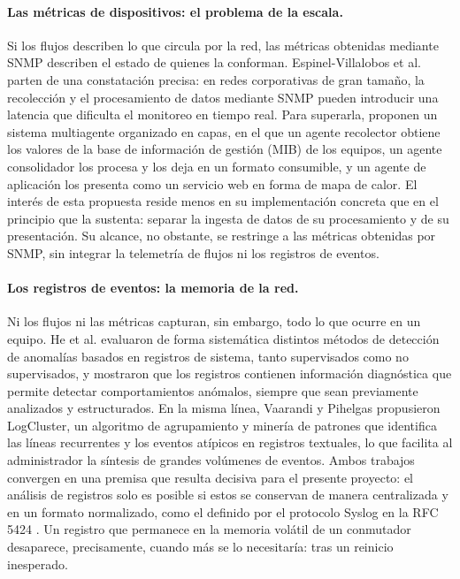\paragraph{Las métricas de dispositivos: el problema de la escala.}
Si los flujos describen lo que circula por la red, las métricas obtenidas mediante SNMP describen el estado de quienes la conforman. Espinel-Villalobos et al. \cite{espinel2022design} parten de una constatación precisa: en redes corporativas de gran tamaño, la recolección y el procesamiento de datos mediante SNMP pueden introducir una latencia que dificulta el monitoreo en tiempo real. Para superarla, proponen un sistema multiagente organizado en capas, en el que un agente recolector obtiene los valores de la base de información de gestión (MIB) de los equipos, un agente consolidador los procesa y los deja en un formato consumible, y un agente de aplicación los presenta como un servicio web en forma de mapa de calor. El interés de esta propuesta reside menos en su implementación concreta que en el principio que la sustenta: separar la ingesta de datos de su procesamiento y de su presentación. Su alcance, no obstante, se restringe a las métricas obtenidas por SNMP, sin integrar la telemetría de flujos ni los registros de eventos.

\paragraph{Los registros de eventos: la memoria de la red.}
Ni los flujos ni las métricas capturan, sin embargo, todo lo que ocurre en un equipo. He et al. \cite{he2016experience} evaluaron de forma sistemática distintos métodos de detección de anomalías basados en registros de sistema, tanto supervisados como no supervisados, y mostraron que los registros contienen información diagnóstica que permite detectar comportamientos anómalos, siempre que sean previamente analizados y estructurados. En la misma línea, Vaarandi y Pihelgas \cite{vaarandi2015logcluster} propusieron LogCluster, un algoritmo de agrupamiento y minería de patrones que identifica las líneas recurrentes y los eventos atípicos en registros textuales, lo que facilita al administrador la síntesis de grandes volúmenes de eventos. Ambos trabajos convergen en una premisa que resulta decisiva para el presente proyecto: el análisis de registros solo es posible si estos se conservan de manera centralizada y en un formato normalizado, como el definido por el protocolo Syslog en la RFC 5424 \cite{gerhards2009syslog}. Un registro que permanece en la memoria volátil de un conmutador desaparece, precisamente, cuando más se lo necesitaría: tras un reinicio inesperado.

